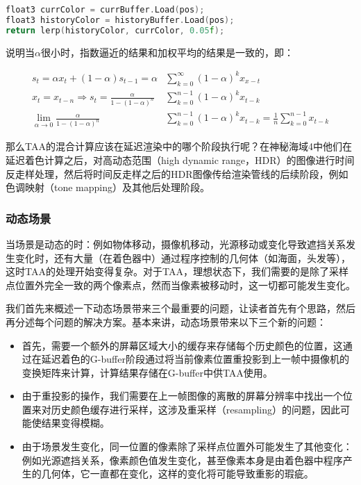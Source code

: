 \begin{lstlisting}[language=C++]
float3 currColor = currBuffer.Load(pos);
float3 historyColor = historyBuffer.Load(pos);
return lerp(historyColor, currColor, 0.05f);
\end{lstlisting}

\cite{a:HighQualityTemporalSupersampling}说明当$\alpha$很小时，指数逼近的结果和加权平均的结果是一致的，即：

\begin{equation}
\begin{aligned}
	s_t=\alpha x_t+(1-\alpha)s_{t-1}=\alpha &\sum^{\infty}_{k=0}(1-\alpha)^{k}x_{x-t}\\
	x_t=x_{t-n}\Rightarrow s_t=\frac{\alpha}{1-(1-\alpha)^{n}}&\sum^{n-1}_{k=0}(1-\alpha)^{k}x_{t-k}\\
	\lim_{\alpha\rightarrow 0}\frac{\alpha}{1-(1-\alpha)^{n}}&\sum^{n-1}_{k=0}(1-\alpha)^{k}x_{t-k}=\frac{1}{n}\sum^{n-1}_{k=0}x_{t-k}
\end{aligned}
\end{equation}

那么TAA的混合计算应该在延迟渲染中的哪个阶段执行呢？在神秘海域4中他们在延迟着色计算之后，对高动态范围（high dynamic range，HDR）的图像进行时间反走样处理，然后将时间反走样之后的HDR图像传给渲染管线的后续阶段，例如色调映射（tone mapping）及其他后处理阶段。







\subsubsection{动态场景}
当场景是动态的时：例如物体移动，摄像机移动，光源移动或变化导致遮挡关系发生变化时，还有大量（在着色器中）通过程序控制的几何体（如海面，头发等），这时TAA的处理开始变得复杂。对于TAA，理想状态下，我们需要的是除了采样点位置外完全一致的两个像素点，然而当像素被移动时，这一切都可能发生变化。

我们首先来概述一下动态场景带来三个最重要的问题，让读者首先有个思路，然后再分述每个问题的解决方案。基本来讲，动态场景带来以下三个新的问题：

\begin{itemize}
	\item 首先，需要一个额外的屏幕区域大小的缓存来存储每个历史颜色的位置，这通过在延迟着色的G-buffer阶段通过将当前像素位置重投影到上一帧中摄像机的变换矩阵来计算，计算结果存储在G-buffer中供TAA使用。
	\item 由于重投影的操作，我们需要在上一帧图像的离散的屏幕分辨率中找出一个位置来对历史颜色缓存进行采样，这涉及重采样（resampling）的问题，因此可能使结果变得模糊。
	\item 由于场景发生变化，同一位置的像素除了采样点位置外可能发生了其他变化：例如光源遮挡关系，像素颜色值发生变化，甚至像素本身是由着色器中程序产生的几何体，它一直都在变化，这样的变化将可能导致重影的瑕疵。
\end{itemize}

